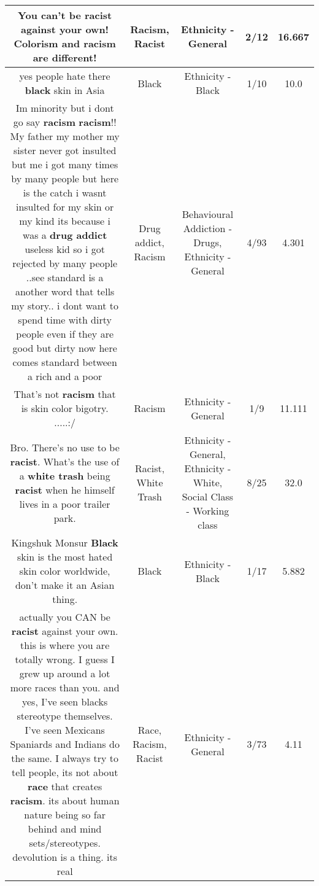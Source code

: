 \documentclass[11pt]{article}
\newlength\mylength
\begin{document}
\begin{center}
\begin{longtable}{|C{.65\mylength}|C{.30\mylength}|C{.12\mylength}|C{.12\mylength}|C{.12\mylength}|}
  \small You can't be \textbf{racist} against your own! Colorism and \textbf{racism} are different!\normalsize   & Racism, Racist & Ethnicity - General & 2/12 & 16.667 \\  \hline
  \small {} yes people hate there \textbf{black} skin in Asia\normalsize   & Black & Ethnicity - Black & 1/10 & 10.0 \\  \hline
  \small Im minority but i dont go say \textbf{racism} \textbf{racism}!! My father my mother my sister never got insulted but me i got many times by many people but here is the catch i wasnt insulted for my skin or my kind its because i was a \textbf{drug addict} useless kid so i got rejected by many people ..see standard is a another word that tells my story.. i dont want to spend time with dirty people even if they are good but dirty now here comes standard between a rich and a poor\normalsize   & Drug addict, Racism & Behavioural Addiction - Drugs, Ethnicity - General & 4/93 & 4.301 \\  \hline
  \small That's not \textbf{racism} that is skin color bigotry. .....:/\normalsize   & Racism & Ethnicity - General & 1/9 & 11.111 \\  \hline
  \small Bro. There's no use to be \textbf{racist}. What's the use of a \textbf{w\textbf{hite trash}} being \textbf{racist} when he himself lives in a poor trailer park.\normalsize   & Racist, White Trash & Ethnicity - General, Ethnicity - White, Social Class - Working class & 8/25 & 32.0 \\  \hline
  \small Kingshuk Monsur \textbf{Black} skin is the most hated skin color worldwide, don't make it an Asian thing.\normalsize   & Black & Ethnicity - Black & 1/17 & 5.882 \\  \hline
  \small actually you CAN be \textbf{racist} against your own. this is where you are totally wrong. I guess I grew up around a lot more races than you. and yes, I've seen blacks stereotype themselves. I've seen Mexicans Spaniards and Indians do the same. I always try to tell people, its not about \textbf{race} that creates \textbf{racism}. its about human nature being so far behind and mind sets/stereotypes. devolution is a thing. its real\normalsize   & Race, Racism, Racist & Ethnicity - General & 3/73 & 4.11 \\  \hline

\end{longtable}
\end{center}
\end{document}
